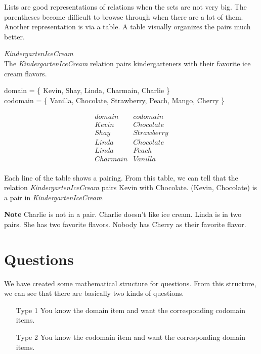 \documentclass{ximera}
\begin{document}
Lists are good representations of relations when the sets are not very big. The parentheses become difficult to browse through when there are a lot of them. Another representation is via a table. A table visually organizes the pairs much better.

\begin{example} \textit{KindergartenIceCream} \\
The \textit{KindergartenIceCream} relation pairs kindergarteners with their favorite ice cream flavors.

domain = \{ Kevin, Shay, Linda, Charmain, Charlie \}  \\
codomain = \{ Vanilla, Chocolate, Strawberry, Peach, Mango, Cherry \} 

\[
\begin{array}{l|l}
    domain      & codomain      \\ \hline
    Kevin   &  Chocolate \\
    Shay   & Strawberry \\
    Linda  &  Chocolate \\
    Linda  &  Peach \\
    Charmain &  Vanilla \\ 
\end{array}
\]


Each line of the table shows a pairing. From this table, we can tell that the relation \textit{KindergartenIceCream} pairs Kevin with Chocolate.  (Kevin, Chocolate) is a pair in \textit{KindergartenIceCream}.

\textbf{Note} Charlie is not in a pair.  Charlie doesn't like ice cream. Linda is in two pairs.  She has two favorite flavors.  Nobody has Cherry as their favorite flavor.

\end{example} 





\section{Questions}


We have created some mathematical structure for questions. From this structure, we can see that there are basically two kinds of questions.

\begin{itemize}
\item [Type 1] You know the domain item and want the corresponding codomain items.
\item [Type 2] You know the codomain item and want the corresponding domain items.
\end{itemize}
\end{document}
